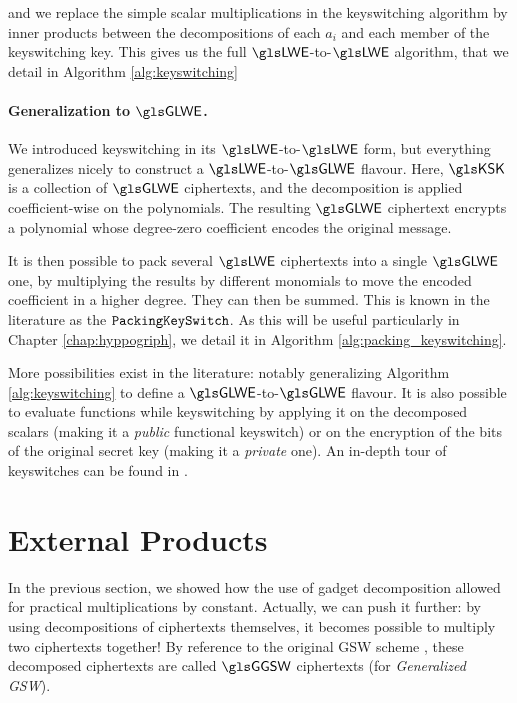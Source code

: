 \noindent
and we replace the simple scalar multiplications in the keyswitching algorithm by inner products between the decompositions of each $a_i$ and each member of the keyswitching key. This gives us the full $\LWE$-to-$\LWE$ algorithm, that we detail in Algorithm \ref{alg:keyswitching}








\paragraph{Generalization to $\GLWE$.}


We introduced keyswitching in its $\LWE$-to-$\LWE$ form, but everything generalizes nicely to construct a $\LWE$-to-$\GLWE$ flavour. Here, $\KSK$ is a collection of $\GLWE$ ciphertexts, and the decomposition is applied coefficient-wise on the polynomials. The resulting $\GLWE$ ciphertext encrypts a polynomial whose degree-zero coefficient encodes the original message.


It is then possible to pack several $\LWE$ ciphertexts into a single $\GLWE$ one, by multiplying the results by different monomials to move the encoded coefficient in a higher degree. They can then be summed. This is known in the literature as the $\texttt{PackingKeySwitch}$. As this will be useful particularly in Chapter \ref{chap:hyppogriph}, we detail it in Algorithm \ref{alg:packing_keyswitching}.




More possibilities exist in the literature: notably generalizing Algorithm \ref{alg:keyswitching} to define a $\GLWE$-to-$\GLWE$ flavour. It is also possible to evaluate functions while keyswitching by applying it on the decomposed scalars (making it a \textit{public} functional keyswitch) or on the encryption of the bits of the original secret key (making it a \textit{private} one). An in-depth tour of keyswitches can be found in \cite{these_tap}.


\section{External Products}
\label{sec:external_products}

In the previous section, we showed how the use of gadget decomposition allowed for practical multiplications by constant. Actually, we can push it further: by using decompositions of ciphertexts themselves, it becomes possible to multiply two ciphertexts together! By reference to the original GSW scheme \cite{C:GenSahWat13}, these decomposed ciphertexts are called $\GGSW$ ciphertexts (for \textit{Generalized GSW}).


